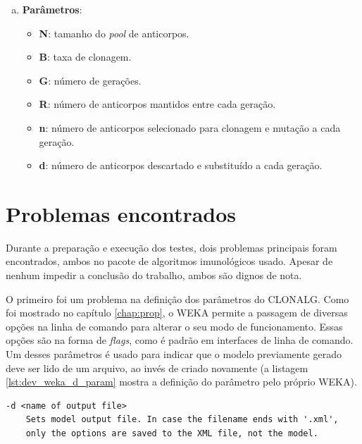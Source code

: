 \begin{enumerate}[a)]
    \item \textbf{Parâmetros}:
        \begin{itemize}
            \item \textbf{N}: tamanho do \emph{pool} de anticorpos.
            \item \textbf{B}: taxa de clonagem.
            \item \textbf{G}: número de gerações.
            \item \textbf{R}: número de anticorpos mantidos entre cada geração.
            \item \textbf{n}: número de anticorpos selecionado para clonagem e mutação a cada geração.
            \item \textbf{d}: número de anticorpos descartado e substituído a cada geração.
        \end{itemize}
\end{enumerate}

\section{Problemas encontrados}
\label{sec:dev_weka_issues}

Durante a preparação e execução dos testes, dois problemas principais foram encontrados, ambos no pacote de algoritmos imunológicos usado. Apesar de nenhum impedir a conclusão do trabalho, ambos são dignos de nota.

O primeiro foi um problema na definição dos parâmetros do CLONALG. Como foi mostrado no capítulo \ref{chap:prop}, o WEKA permite a passagem de diversas opções na linha de comando para alterar o seu modo de funcionamento. Essas opções são na forma de \emph{flags}, como é padrão em interfaces de linha de comando. Um desses parâmetros é usado para indicar que o modelo previamente gerado deve ser lido de um arquivo, ao invés de criado novamente (a listagem \ref{lst:dev_weka_d_param} mostra a definição do parâmetro pelo próprio WEKA).

\vspace{0.5cm}
\begin{lstlisting}[caption=Definição do parâmetro ``d'' no wEKA, label=lst:dev_weka_d_param]
-d <name of output file>
    Sets model output file. In case the filename ends with '.xml',
    only the options are saved to the XML file, not the model.
\end{lstlisting}
\vspace{0.5cm}

